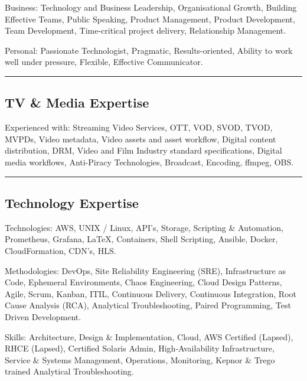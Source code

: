 \documentclass[10pt,a4paper]{article}
\newenvironment{indentsection}[1]%
{\begin{list}{}%
	{\setlength{\leftmargin}{#1}}%
	\item[]%
}
{\end{list}}
\begin{document}
\begin{indentsection}{\parindent}
\begin{description*}
		\item[Business:]
		Technology and Business Leadership, Organisational Growth, Building Effective Teams, Public Speaking, Product Management, Product Development, Team Development, Time-critical project delivery, Relationship Management.
    \item[Personal:]
		Passionate Technologist, Pragmatic, Results-oriented, Ability to work well under pressure, Flexible, Effective Communicator.
\end{description*}
\end{indentsection}

\hrule
\vspace{-0.4em}
\subsection*{TV \& Media Expertise}

\begin{indentsection}{\parindent}
\begin{description*}
	\item[Experienced with:]
	Streaming Video Services, OTT, VOD, SVOD, TVOD, MVPDs, Video metadata, Video assets and asset workflow, Digital content distribution, DRM, Video and Film Industry standard specifications, Digital media workflows, Anti-Piracy Technologies, Broadcast, Encoding, ffmpeg, OBS.

\end{description*}
\end{indentsection}

\hrule
\vspace{-0.4em}
\subsection*{Technology Expertise}

\begin{indentsection}{\parindent}
\begin{description*}
	\item[Technologies:]
	AWS, UNIX / Linux, API's, Storage, Scripting \& Automation, Prometheus, Grafana, \LaTeX, Containers, Shell Scripting, Ansible, Docker, CloudFormation, CDN's, HLS.
	\item[Methodologies:]
	DevOps, Site Reliability Engineering (SRE), Infrastructure as Code, Ephemeral Environments, Chaos Engineering, Cloud Design Patterns, Agile, Scrum, Kanban, ITIL, Continuous Delivery, Continuous Integration, Root Cause Analysis (RCA), Analytical Troubleshooting, Paired Programming, Test Driven Development.
	\item[Skills:]
	Architecture, Design \& Implementation, Cloud, AWS Certified (Lapsed), RHCE (Lapsed), Certified Solaris Admin, High-Availability Infrastructure, Service \& Systems Management, Operations, Monitoring, Kepnor \& Trego trained Analytical Troubleshooting.
\end{description*}
\end{indentsection}
\end{document}
